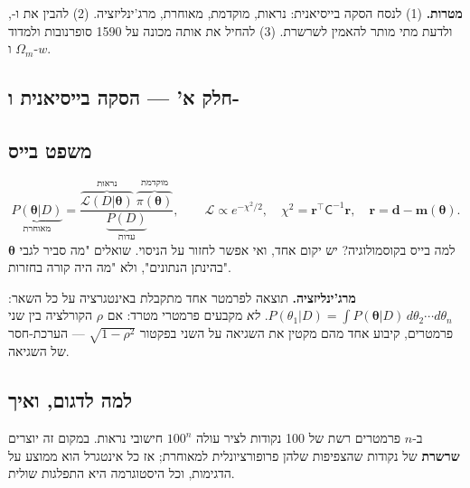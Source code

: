 
\begin{goalbox}
\textbf{מטרות.} (1) לנסח הסקה בייסיאנית: נראות, מוקדמת, מאוחרת, מרג'ינליזציה. (2) להבין את  ו-, ולדעת מתי מותר להאמין לשרשרת. (3) להחיל את אותה מכונה על 1590 סופרנובות ולמדוד $\Omega_m$ ו-$w$.
\end{goalbox}

\subsection*{חלק א' --- הסקה בייסיאנית ו-}

\subsection{משפט בייס}
\begin{equation}
\underbrace{P(\boldsymbol\theta|D)}_{\text{מאוחרת}}=\frac{\overbrace{\mathcal L(D|\boldsymbol\theta)}^{\text{נראות}}\ \overbrace{\pi(\boldsymbol\theta)}^{\text{מוקדמת}}}{\underbrace{P(D)}_{\text{עדות}}},
\qquad
\mathcal L\propto e^{-\chi^2/2},\quad \chi^2=\mathbf r^{\!\top}\mathsf C^{-1}\mathbf r,\quad \mathbf r=\mathbf d-\mathbf m(\boldsymbol\theta).
\end{equation}
למה בייס בקוסמולוגיה? יש יקום אחד, ואי אפשר לחזור על הניסוי. שואלים "מה סביר לגבי $\boldsymbol\theta$ בהינתן הנתונים", ולא "מה היה קורה בחזרות".

\textbf{מרג'ינליזציה.} תוצאה לפרמטר אחד מתקבלת באינטגרציה על כל השאר: $P(\theta_1|D)=\int P(\boldsymbol\theta|D)\,d\theta_2\cdots d\theta_n$. \emph{לא} מקבעים פרמטרי מטרד: אם $\rho$ הקורלציה בין שני פרמטרים, קיבוע אחד מהם מקטין את השגיאה על השני בפקטור $\sqrt{1-\rho^2}$ --- הערכת-חסר של השגיאה.

\subsection{למה לדגום, ואיך}
ב-$n$ פרמטרים רשת של 100 נקודות לציר עולה $100^n$ חישובי נראות. במקום זה יוצרים \textbf{שרשרת} של נקודות שהצפיפות שלהן פרופורציונלית למאוחרת; אז כל אינטגרל הוא ממוצע על הדגימות, וכל היסטוגרמה היא התפלגות שולית.

